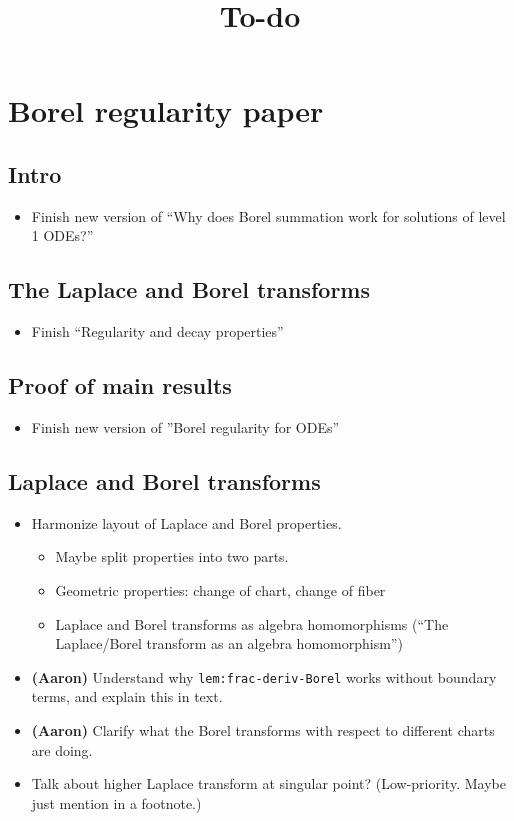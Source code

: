 \documentclass{article}
\title{To-do}
\date{}
\begin{document}
\maketitle
\section{Borel regularity paper}
\subsection{Intro}
\begin{itemize}
\item Finish new version of ``Why does Borel summation work for solutions of level 1 ODEs?''
\end{itemize}
\subsection{The Laplace and Borel transforms}
\begin{itemize}
\item Finish ``Regularity and decay properties''
\end{itemize}
\subsection{Proof of main results}
\begin{itemize}
    \item Finish new version of ''Borel regularity for ODEs''
\end{itemize}
\subsection{Laplace and Borel transforms}
\begin{itemize}
\item Harmonize layout of Laplace and Borel properties.
\begin{itemize}
  \item Maybe split properties into two parts.
  \item Geometric properties: change of chart, change of fiber
  \item Laplace and Borel transforms as algebra homomorphisms (``The Laplace/Borel transform as an algebra homomorphism'')
\end{itemize}
\item \textbf{(Aaron)} Understand why \texttt{lem:frac-deriv-Borel} works without boundary terms, and explain this in text.
\item \textbf{(Aaron)} Clarify what the Borel transforms with respect to different charts are doing.
\item Talk about higher Laplace transform at singular point? (Low-priority. Maybe just mention in a footnote.)
\end{itemize}
\end{document}
